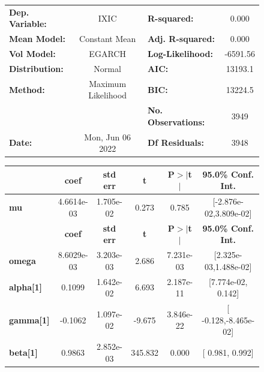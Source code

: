 \documentclass[a4paper, oneside]{discothesis}
\begin{document}
\begin{figure}
\begin{multicols}{2}
{  
\begin{center}
\begin{tabular}{lclc}
\toprule
\textbf{Dep. Variable:} &        IXIC        & \textbf{  R-squared:         } &     0.000   \\
\textbf{Mean Model:}    &   Constant Mean    & \textbf{  Adj. R-squared:    } &     0.000   \\
\textbf{Vol Model:}     &       EGARCH       & \textbf{  Log-Likelihood:    } &   -6591.56  \\
\textbf{Distribution:}  &       Normal       & \textbf{  AIC:               } &    13193.1  \\
\textbf{Method:}        & Maximum Likelihood & \textbf{  BIC:               } &    13224.5  \\
\textbf{}               &                    & \textbf{  No. Observations:  } &    3949     \\
\textbf{Date:}          &  Mon, Jun 06 2022  & \textbf{  Df Residuals:      } &    3948     \\
\bottomrule
\end{tabular}
\begin{tabular}{lccccc}
            & \textbf{coef} & \textbf{std err} & \textbf{t} & \textbf{P$> |$t$|$} & \textbf{95.0\% Conf. Int.}  \\
\midrule
\textbf{mu} &   4.6614e-03  &    1.705e-02     &     0.273  &          0.785       &   [-2.876e-02,3.809e-02]    \\
                  & \textbf{coef} & \textbf{std err} & \textbf{t} & \textbf{P$> |$t$|$} & \textbf{95.0\% Conf. Int.}  \\
\midrule
\textbf{omega}    &   8.6029e-03  &    3.203e-03     &     2.686  &      7.231e-03       &   [2.325e-03,1.488e-02]     \\
\textbf{alpha[1]} &       0.1099  &    1.642e-02     &     6.693  &      2.187e-11       &    [7.774e-02,  0.142]      \\
\textbf{gamma[1]} &      -0.1062  &    1.097e-02     &    -9.675  &      3.846e-22       &    [ -0.128,-8.465e-02]     \\
\textbf{beta[1]}  &       0.9863  &    2.852e-03     &   345.832  &        0.000         &     [  0.981,  0.992]       \\
\bottomrule
\end{tabular}
\end{center}

}
\end{multicols}
\end{figure}
\end{document}
